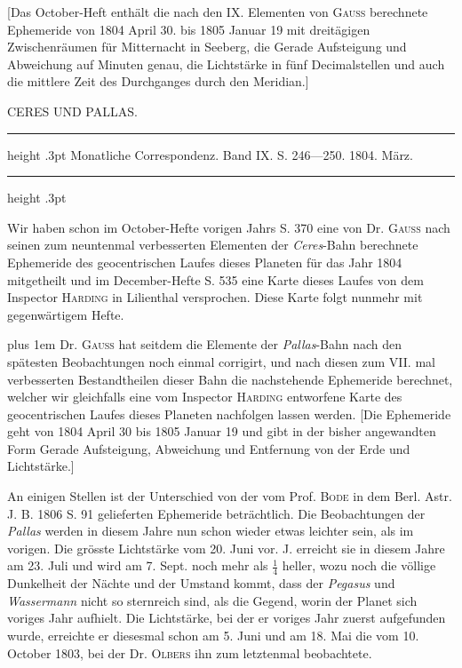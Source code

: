 [Das October-Heft enthält die nach den IX. Elementen von \textsc{Gauss} berechnete Ephemeride von 1804 April 30. bis 1805 Januar 19 mit dreitägigen Zwischenräumen für Mitternacht in Seeberg, die Gerade Aufsteigung und Abweichung auf Minuten genau, die Lichtstärke in fünf Decimalstellen und auch die mittlere Zeit des Durchganges durch den Meridian.]

\begin{flushright}
\end{flushright}

\par\medskip
{}
\begin{center}\large CERES UND PALLAS.\end{center}
\begin{center}\parbox{.86\linewidth}{\centering\footnotesize\frenchspacing
\hrule height .3pt\relax\vspace{2.5pt}
Monatliche Correspondenz. Band IX. S. 246—250. 1804. März.\par
\vspace{2.5pt}\hrule height .3pt\relax
}\end{center}
Wir haben schon im October-Hefte vorigen Jahrs S. 370 eine von Dr. \textsc{Gauss} nach seinen zum neuntenmal verbesserten Elementen der \emph{Ceres}-Bahn berechnete Ephemeride des geocentrischen Laufes dieses Planeten für das Jahr 1804 mitgetheilt und im December-Hefte S. 535 eine Karte dieses Laufes von dem Inspector \textsc{Harding} in Lilienthal versprochen. Diese Karte folgt nunmehr mit gegenwärtigem Hefte.

{\rightskip=0pt plus 1em
Dr. \textsc{Gauss} hat seitdem die Elemente der \emph{Pallas}-Bahn nach den spätesten Beobachtungen noch einmal corrigirt, und nach diesen zum VII. mal verbesserten Bestandtheilen dieser Bahn die nachstehende Ephemeride berechnet, welcher wir gleichfalls eine vom Inspector \textsc{Harding} entworfene Karte des geocentrischen Laufes dieses Planeten nachfolgen lassen werden. [Die Ephemeride geht von 1804 April 30 bis 1805 Januar 19 und gibt in der bisher angewandten Form Gerade Aufsteigung, Abweichung und Entfernung von der Erde und Lichtstärke.]\par}


An einigen Stellen ist der Unterschied von der vom Prof. \textsc{Bode} in dem Berl. Astr. J. B. 1806 S. 91 gelieferten Ephemeride beträchtlich. Die Beobachtungen der \emph{Pallas} werden in diesem Jahre nun schon wieder etwas leichter sein, als im vorigen. Die grösste Lichtstärke vom 20. Juni vor. J. erreicht sie in diesem Jahre am 23. Juli und wird am 7. Sept. noch mehr als $\frac{1}{4}$ heller, wozu noch die völlige Dunkelheit der Nächte und der Umstand kommt, dass der \emph{Pegasus} und \emph{Wassermann} nicht so sternreich sind, als die Gegend, worin der Planet sich voriges Jahr aufhielt. Die Lichtstärke, bei der er voriges Jahr zuerst aufgefunden wurde, erreichte er diesesmal schon am 5. Juni und am 18. Mai die vom 10. October 1803, bei der Dr. \textsc{Olbers} ihn zum letztenmal beobachtete.

